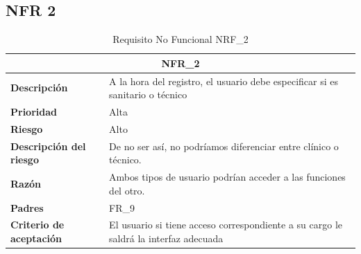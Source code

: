 \documentclass{scrreprt}
\begin{document}
\subsection{NFR 2}
    \begin{table}[H]
        \label{tab:my-table}
        \begin{tabular}{|p{5cm}|p{11cm}|}
        \hline
        \multicolumn{2}{|c|}{\textbf{NFR_2}} \\
        \hline
        \textbf{Descripción  }                      &  A la hora del registro, el usuario debe especificar si es sanitario o técnico                                                                      \\ \hline
        \textbf{Prioridad}                          & Alta                                                                                              \\ \hline
        \textbf{Riesgo}                          & Alto                                                                                                \\ \hline
        \textbf{Descripción del riesgo}                    &  De no ser así, no podríamos diferenciar entre clínico o técnico.                          \\ \hline
        \textbf{Razón}                   & Ambos tipos de usuario podrían acceder a las funciones del otro.                                                                                                                       \\ \hline
        \textbf{Padres}                               &  FR_9\\  \hline
         \textbf{Criterio de aceptación}                    & El usuario si tiene acceso correspondiente a su cargo le saldrá la interfaz adecuada  \\ \hline
        \end{tabular}%
        
        \caption{Requisito No Funcional NRF_2}
\end{table}
\end{document}
